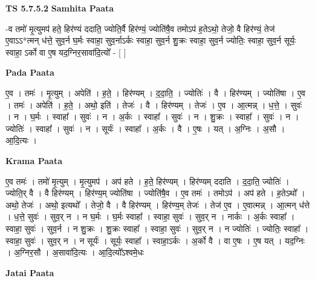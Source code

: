 \documentclass[17pt]{extarticle}
\begin{document}
\textbf{TS 5.7.5.2 } \newline
\textbf{Samhita Paata} \newline

-व तमो॑ मृ॒त्युमप॑ हते॒ हिर॑ण्यं ददाति॒ ज्योति॒र्वै हिर॑ण्यं॒ ज्योति॑षै॒व तमोऽप॑ ह॒तेऽथो॒ तेजो॒ वै हिर॑ण्यं॒ तेज॑ ए॒वाऽऽ*त्मन् ध॑त्ते॒ सुव॒र्न घ॒र्मः स्वाहा॒ सुव॒र्नाऽर्कः स्वाहा॒ सुव॒र्न शु॒क्रः स्वाहा॒ सुव॒र्न ज्योतिः॒ स्वाहा॒ सुव॒र्न सूर्यः॒ स्वाहा॒ ऽर्को वा ए॒ष यद॒ग्निर॒सावा॑दि॒त्यो᳚ - [  ] \newline

\textbf{Pada Paata} \newline

ए॒व । तमः॑ । मृ॒त्युम् । अपेति॑ । ह॒ते॒ । हिर॑ण्यम् । द॒दा॒ति॒ । ज्योतिः॑ । वै । हिर॑ण्यम् । ज्योति॑षा । ए॒व । तमः॑ । अपेति॑ । ह॒ते॒ । अथो॒ इति॑ । तेजः॑ । वै । हिर॑ण्यम् । तेजः॑ । ए॒व । आ॒त्मन्न् । ध॒त्ते॒ । सुवः॑ । न । घ॒र्मः । स्वाहा᳚ । सुवः॑ । न । अ॒र्कः । स्वाहा᳚ । सुवः॑ । न । शु॒क्रः । स्वाहा᳚ । सुवः॑ । न । ज्योतिः॑ । स्वाहा᳚ । सुवः॑ । न । सूर्यः॑ । स्वाहा᳚ । अ॒र्कः । वै । ए॒षः । यत् । अ॒ग्निः । अ॒सौ । आ॒दि॒त्यः ।  \newline


\textbf{Krama Paata} \newline

ए॒व तमः॑ । तमो॑ मृ॒त्युम् । मृ॒त्युमप॑ । अप॑ हते । ह॒ते॒ हिर॑ण्यम् । हिर॑ण्यम् ददाति । द॒दा॒ति॒ ज्योतिः॑ । ज्योति॒र् वै । वै हिर॑ण्यम् । हिर॑ण्य॒म् ज्योति॑षा । ज्योति॑षै॒व । ए॒व तमः॑ । तमोऽप॑ । अप॑ हते । ह॒तेऽथो᳚ । अथो॒ तेजः॑ । अथो॒ इत्यथो᳚ । तेजो॒ वै । वै हिर॑ण्यम् । हिर॑ण्य॒म् तेजः॑ । तेज॑ ए॒व । ए॒वात्मन्न् । आ॒त्मन् ध॑त्ते । ध॒त्ते॒ सुवः॑ । सुव॒र् न । न घ॒र्मः । घ॒र्मः स्वाहा᳚ । स्वाहा॒ सुवः॑ । सुव॒र् न । नार्कः । अ॒र्कः स्वाहा᳚ । स्वाहा॒ सुवः॑ । सुव॒र्न । न शु॒क्रः । शु॒क्रः स्वाहा᳚ । स्वाहा॒ सुवः॑ । सुव॒र् न । न ज्योतिः॑ । ज्योतिः॒ स्वाहा᳚ । स्वाहा॒ सुवः॑ । सुव॒र् न । न सूर्यः॑ । सूर्यः॒ स्वाहा᳚ । स्वाहा॒ऽर्कः । अ॒र्को वै । वा ए॒षः । ए॒ष यत् । यद॒ग्निः । अ॒ग्निर॒सौ । अ॒सावा॑दि॒त्यः । आ॒दि॒त्यो᳚ऽश्वमे॒धः \newline

\textbf{Jatai Paata} \newline
\end{document}

